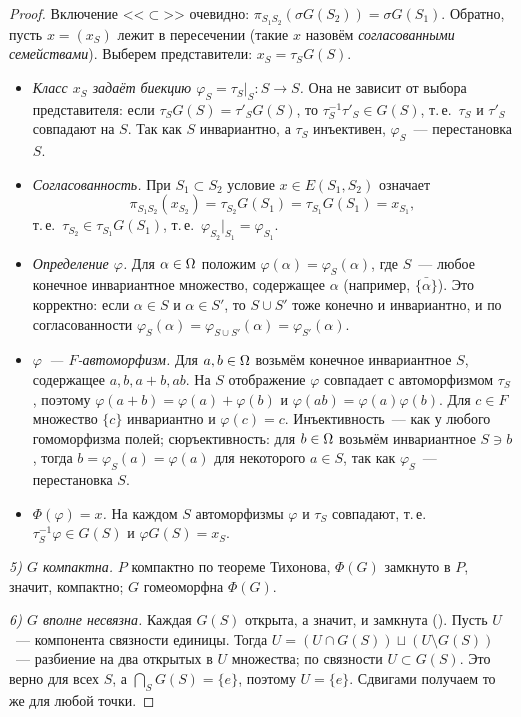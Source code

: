 \begin{proof}
Включение <<$\subset$>> очевидно: $\pi_{S_1S_2}(\sigma G(S_2))=\sigma G(S_1)$. Обратно, пусть $x=(x_S)$ лежит в
пересечении (такие $x$ назовём \emph{согласованными семействами}). Выберем представители: $x_S=\tau_SG(S)$.
\begin{itemize}[leftmargin=*]
\item \emph{Класс $x_S$ задаёт биекцию $\varphi_S=\tau_S|_S\colon S\to S$.} Она не зависит от выбора представителя: если
$\tau_SG(S)=\tau'_SG(S)$, то $\tau_S^{-1}\tau'_S\in G(S)$, т.\,е.\ $\tau_S$ и $\tau'_S$ совпадают на $S$. Так как $S$
инвариантно, а $\tau_S$ инъективен, $\varphi_S$~--- перестановка $S$.
\item \emph{Согласованность.} При $S_1\subset S_2$ условие $x\in E(S_1,S_2)$ означает
\[
\pi_{S_1S_2}(x_{S_2})=\tau_{S_2}G(S_1)=\tau_{S_1}G(S_1)=x_{S_1},
\]
т.\,е.\ $\tau_{S_2}\in\tau_{S_1}G(S_1)$,
т.\,е.\ $\varphi_{S_2}|_{S_1}=\varphi_{S_1}$.
\item \emph{Определение $\varphi$.} Для $\alpha\in\Omega$ положим $\varphi(\alpha)=\varphi_S(\alpha)$, где $S$~--- любое
конечное инвариантное множество, содержащее $\alpha$ (например, $\bar{\{\alpha\}}$). Это корректно: если $\alpha\in S$ и
$\alpha\in S'$, то $S\cup S'$ тоже конечно и инвариантно, и по согласованности
$\varphi_S(\alpha)=\varphi_{S\cup S'}(\alpha)=\varphi_{S'}(\alpha)$.
\item \emph{$\varphi$~--- $F$-автоморфизм.} Для $a,b\in\Omega$ возьмём конечное инвариантное $S$, содержащее $a,b,a+b,ab$. На
$S$ отображение $\varphi$ совпадает с автоморфизмом $\tau_S$, поэтому $\varphi(a+b)=\varphi(a)+\varphi(b)$ и
$\varphi(ab)=\varphi(a)\varphi(b)$. Для $c\in F$ множество $\{c\}$ инвариантно и $\varphi(c)=c$. Инъективность~--- как у
любого гомоморфизма полей; сюръективность: для $b\in\Omega$ возьмём инвариантное $S\ni b$, тогда $b=\varphi_S(a)=\varphi(a)$
для некоторого $a\in S$, так как $\varphi_S$~--- перестановка $S$.
\item \emph{$\Phi(\varphi)=x$.} На каждом $S$ автоморфизмы $\varphi$ и $\tau_S$ совпадают, т.\,е.\
$\tau_S^{-1}\varphi\in G(S)$ и $\varphi G(S)=x_S$.
\end{itemize}

\emph{5) $G$ компактна.} $P$ компактно по теореме Тихонова, $\Phi(G)$ замкнуто в $P$, значит, компактно; $G$
гомеоморфна $\Phi(G)$.

\emph{6) $G$ вполне несвязна.} Каждая $G(S)$ открыта, а значит, и замкнута (). Пусть $U$~--- компонента связности
единицы. Тогда $U=(U\cap G(S))\sqcup(U\setminus G(S))$~--- разбиение на два открытых в $U$ множества; по связности
$U\subset G(S)$. Это верно для всех $S$, а $\bigcap_SG(S)=\{e\}$, поэтому $U=\{e\}$. Сдвигами получаем то же для любой
точки.


\end{proof}
